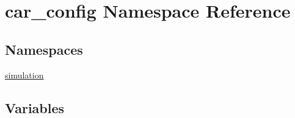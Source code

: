 \hypertarget{namespacecar__config}{}\section{car\+\_\+config Namespace Reference}
\label{namespacecar__config}
\subsection*{Namespaces}
\begin{DoxyCompactItemize}
\item 
 \hyperlink{namespacecar__config_1_1simulation}{simulation}
\end{DoxyCompactItemize}
\subsection*{Variables}
